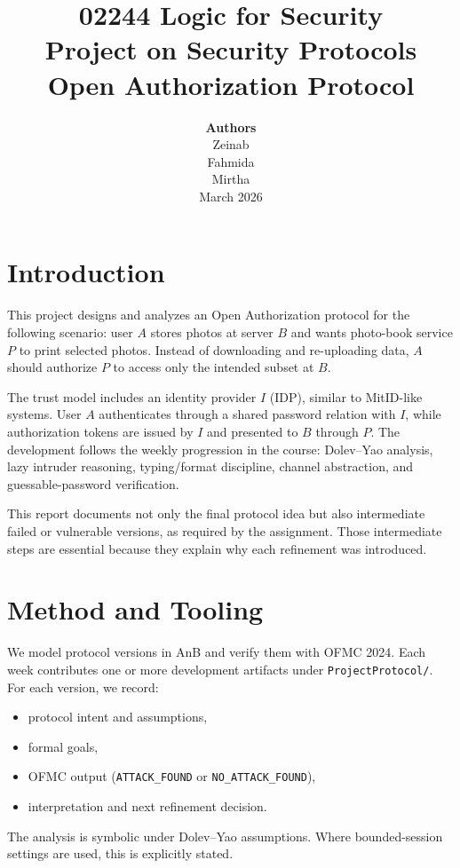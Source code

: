 \documentclass[11pt,a4paper]{article}
\title{02244 Logic for Security\\Project on Security Protocols\\
\vspace{0.5em}\large Open Authorization Protocol}
\author{
\textbf{Authors}\\
Zeinab\\
Fahmida\\
Mirtha\\[0.5em]
March 2026
}
\date{}
\begin{document}
\maketitle
\thispagestyle{empty}

\newpage
\tableofcontents
\newpage

\section{Introduction}

This project designs and analyzes an Open Authorization protocol for the following scenario:
user $A$ stores photos at server $B$ and wants photo-book service $P$ to print selected photos.
Instead of downloading and re-uploading data, $A$ should authorize $P$ to access only the intended subset at $B$.

The trust model includes an identity provider $I$ (IDP), similar to MitID-like systems.
User $A$ authenticates through a shared password relation with $I$, while authorization tokens are issued by $I$ and presented to $B$ through $P$.
The development follows the weekly progression in the course: Dolev--Yao analysis, lazy intruder reasoning,
typing/format discipline, channel abstraction, and guessable-password verification.

This report documents not only the final protocol idea but also intermediate failed or vulnerable versions,
as required by the assignment. Those intermediate steps are essential because they explain
why each refinement was introduced.

\section{Method and Tooling}

We model protocol versions in AnB and verify them with OFMC 2024.
Each week contributes one or more development artifacts under \texttt{ProjectProtocol/}.
For each version, we record:
\begin{itemize}[leftmargin=1.2em]
  \item protocol intent and assumptions,
  \item formal goals,
  \item OFMC output (\texttt{ATTACK\_FOUND} or \texttt{NO\_ATTACK\_FOUND}),
  \item interpretation and next refinement decision.
\end{itemize}

The analysis is symbolic under Dolev--Yao assumptions.
Where bounded-session settings are used, this is explicitly stated.
\end{document}
